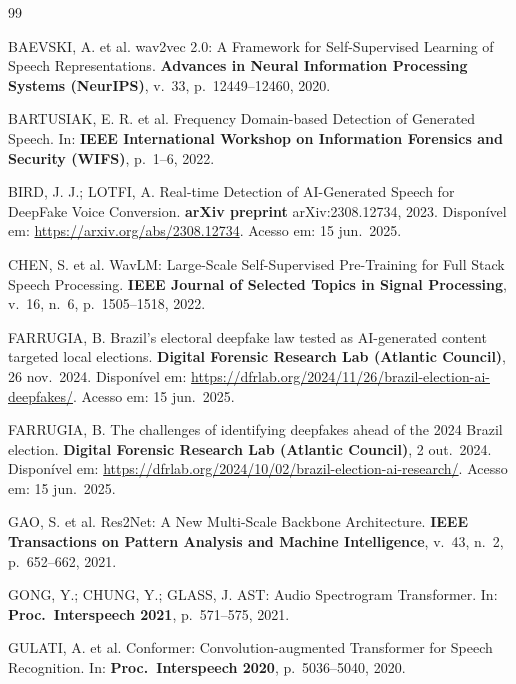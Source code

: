 \documentclass[12pt,a4paper]{article}
\begin{document}
\newpage
\begin{thebibliography}{99}

BAEVSKI, A. et al.
wav2vec 2.0: A Framework for Self-Supervised Learning of Speech
Representations.
\textbf{Advances in Neural Information Processing Systems (NeurIPS)},
v.~33, p.~12449--12460, 2020.

BARTUSIAK, E. R. et al.
Frequency Domain-based Detection of Generated Speech.
In: \textbf{IEEE International Workshop on Information Forensics and Security
(WIFS)}, p.~1--6, 2022.

BIRD, J. J.; LOTFI, A.
Real-time Detection of AI-Generated Speech for DeepFake Voice Conversion.
\textbf{arXiv preprint} arXiv:2308.12734, 2023.
Disponível em: \url{https://arxiv.org/abs/2308.12734}.
Acesso em: 15 jun.\ 2025.

CHEN, S. et al.
WavLM: Large-Scale Self-Supervised Pre-Training for Full Stack Speech
Processing.
\textbf{IEEE Journal of Selected Topics in Signal Processing},
v.~16, n.~6, p.~1505--1518, 2022.

FARRUGIA, B.
Brazil's electoral deepfake law tested as AI-generated content targeted local
elections.
\textbf{Digital Forensic Research Lab (Atlantic Council)}, 26 nov.\ 2024.
Disponível em:
\url{https://dfrlab.org/2024/11/26/brazil-election-ai-deepfakes/}.
Acesso em: 15 jun.\ 2025.

FARRUGIA, B.
The challenges of identifying deepfakes ahead of the 2024 Brazil election.
\textbf{Digital Forensic Research Lab (Atlantic Council)}, 2 out.\ 2024.
Disponível em: \url{https://dfrlab.org/2024/10/02/brazil-election-ai-research/}.
Acesso em: 15 jun.\ 2025.

GAO, S. et al.
Res2Net: A New Multi-Scale Backbone Architecture.
\textbf{IEEE Transactions on Pattern Analysis and Machine Intelligence},
v.~43, n.~2, p.~652--662, 2021.

GONG, Y.; CHUNG, Y.; GLASS, J.
AST: Audio Spectrogram Transformer.
In: \textbf{Proc.\ Interspeech 2021}, p.~571--575, 2021.

GULATI, A. et al.
Conformer: Convolution-augmented Transformer for Speech Recognition.
In: \textbf{Proc.\ Interspeech 2020}, p.~5036--5040, 2020.


\end{thebibliography}
\end{document}
